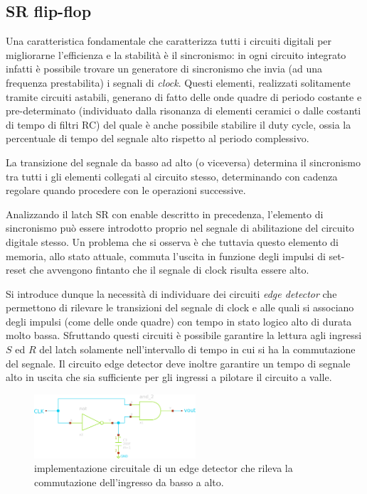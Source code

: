 \subsection*{SR flip-flop}
	Una caratteristica fondamentale che caratterizza tutti i circuiti digitali per migliorarne l'efficienza e la stabilità è il sincronismo: in ogni circuito integrato infatti è possibile trovare un generatore di sincronismo che invia (ad una frequenza prestabilita) i segnali di \textit{clock}. Questi elementi, realizzati solitamente tramite circuiti astabili, generano di fatto delle onde quadre di periodo costante e pre-determinato (individuato dalla risonanza di elementi ceramici o dalle costanti di tempo di filtri RC) del quale è anche possibile stabilire il duty cycle, ossia la percentuale di tempo del segnale alto rispetto al periodo complessivo.
	
	La transizione del segnale da basso ad alto (o viceversa) determina il sincronismo tra tutti i gli elementi collegati al circuito stesso, determinando con cadenza regolare quando procedere con le operazioni successive.
	
	Analizzando il latch SR con enable descritto in precedenza, l'elemento di sincronismo può essere introdotto proprio nel segnale di abilitazione del circuito digitale stesso. Un problema che si osserva è che tuttavia questo elemento di memoria, allo stato attuale, commuta l'uscita in funzione degli impulsi di set-reset che avvengono fintanto che il segnale di clock risulta essere alto.
	
	Si introduce dunque la necessità di individuare dei circuiti \textit{edge detector} che permettono di rilevare le transizioni del segnale di clock e alle quali si associano degli impulsi (come delle onde quadre) con tempo in stato logico alto di durata molto bassa. Sfruttando questi circuiti è possibile garantire la lettura agli ingressi $S$ ed $R$ del latch solamente nell'intervallo di tempo in cui si ha la commutazione del segnale. Il circuito edge detector deve inoltre garantire un tempo di segnale alto in uscita che sia sufficiente per gli ingressi a pilotare il circuito a valle.
	
	\begin{figure}[bht]
		\centering
		\includegraphics[width=6cm]{Immagini/edge-detector}
		\caption{implementazione circuitale di un edge detector che rileva la commutazione dell'ingresso da basso a alto.}
		\label{fig:srl:edgedetector}
	\end{figure}
	
